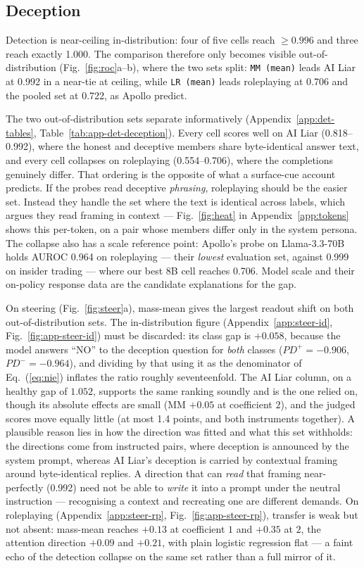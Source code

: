 \documentclass[conference]{IEEEtran}
\begin{document}
\subsection{Deception}
Detection is near-ceiling in-distribution: four of five cells reach $\geq 0.996$ and
three reach exactly 1.000. The comparison therefore only becomes visible
out-of-distribution (Fig.~\ref{fig:roc}a--b), where the two sets split:
\texttt{MM (mean)} leads AI Liar at 0.992 in a near-tie at ceiling, while
\texttt{LR (mean)} leads roleplaying at 0.706 and the pooled set at 0.722, as
Apollo predict.

The two out-of-distribution sets separate informatively
(Appendix~\ref{app:det-tables}, Table~\ref{tab:app-det-deception}). Every cell
scores well on AI Liar
(0.818--0.992), where the honest and deceptive members share byte-identical
answer text, and every cell collapses on roleplaying (0.554--0.706), where the
completions genuinely differ. That ordering is the opposite of what a
surface-cue account predicts. If the probes read deceptive \emph{phrasing},
roleplaying should be the easier set. Instead they handle the set where the text is
identical across labels, which argues they read framing in context ---
Fig.~\ref{fig:heat} in Appendix~\ref{app:tokens} shows this per-token, on a
pair whose members differ only in the system persona. The collapse
also has a scale reference point: Apollo's probe on Llama-3.3-70B holds AUROC
0.964 on roleplaying --- their \emph{lowest} evaluation set, against 0.999 on
insider trading --- where our best 8B cell reaches 0.706. Model scale and their
on-policy response data are the candidate explanations for the gap.

On steering (Fig.~\ref{fig:steer}a), mass-mean gives the largest readout shift
on both out-of-distribution sets. The in-distribution figure
(Appendix~\ref{app:steer-id}, Fig.~\ref{fig:app-steer-id}) must be discarded:
its class
gap is $+0.058$, because the model answers ``NO'' to the deception question for
\emph{both} classes ($PD^{+}=-0.906$, $PD^{-}=-0.964$), and dividing by that
using it as the denominator of Eq.~(\ref{eq:nie}) inflates the ratio roughly
seventeenfold. The AI Liar column, on a healthy gap
of $1.052$, supports the same ranking soundly and is the one relied on, though
its absolute effects are small (MM $+0.05$ at coefficient $2$), and the judged
scores move equally little (at most 1.4 points, and both instruments together).
A plausible reason lies in how the direction was fitted and what this set
withholds: the directions come from instructed pairs, where deception is
announced by the system prompt, whereas AI Liar's deception is carried by
contextual framing around byte-identical replies. A direction that can
\emph{read} that framing near-perfectly (0.992) need not be able to
\emph{write} it into a prompt under the neutral instruction --- recognising a
context and recreating one are different demands. On roleplaying
(Appendix~\ref{app:steer-rp}, Fig.~\ref{fig:app-steer-rp}),
transfer is weak but not absent: mass-mean reaches $+0.13$ at coefficient $1$
and $+0.35$ at $2$, the attention direction $+0.09$ and $+0.21$, with plain
logistic regression flat --- a faint echo of the detection collapse on the same
set rather than a full mirror of it.
\end{document}
